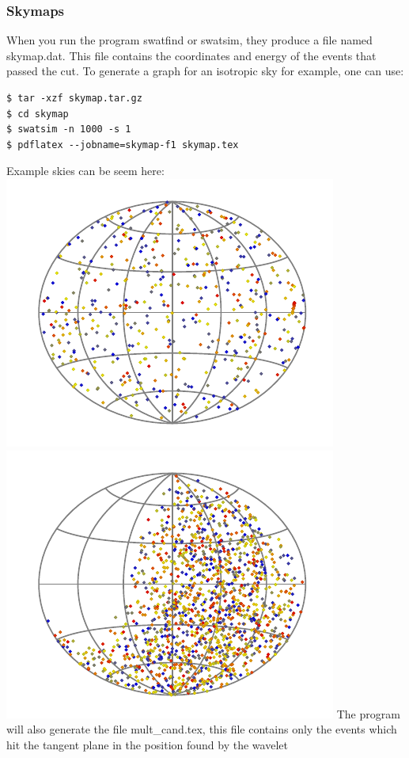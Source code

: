 \documentclass[12pt]{article}
\begin{document}
\subsubsection{Skymaps}
When you run the program swatfind or swatsim, they produce a file named
skymap.dat. This file contains the coordinates and energy of the events that
passed the cut. To generate a graph for an isotropic sky for example, one can
use:
{\bf \color{brown}
\begin{lstlisting}
$ tar -xzf skymap.tar.gz
$ cd skymap
$ swatsim -n 1000 -s 1
$ pdflatex --jobname=skymap-f1 skymap.tex
\end{lstlisting}
}
Example skies can be seem here:\\
\includegraphics[scale=1.0]{skymap-sim.pdf} 
\includegraphics[scale=1.0]{skymap.pdf}
The program will also generate the file mult\_cand.tex, this file contains only
the events which hit the tangent plane in the position found by the wavelet
\end{document}
